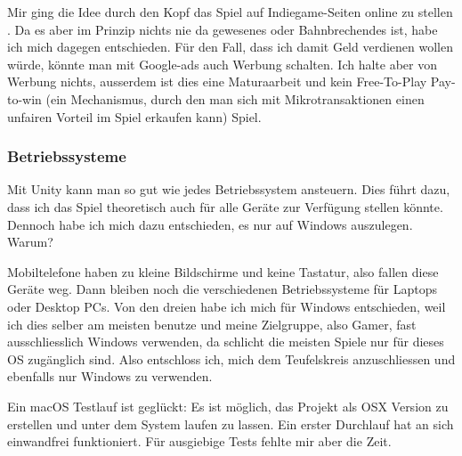 Mir ging die Idee durch den Kopf das Spiel auf Indiegame-Seiten online zu stellen .
Da es aber im Prinzip nichts nie da gewesenes oder Bahnbrechendes ist, habe ich mich dagegen entschieden.
Für den Fall, dass ich damit Geld verdienen wollen würde, könnte man mit Google-ads auch Werbung schalten.
Ich halte aber von Werbung nichts, ausserdem ist dies eine Maturaarbeit und kein Free-To-Play Pay-to-win 
(ein Mechanismus, durch den man sich mit Mikrotransaktionen einen unfairen Vorteil im Spiel erkaufen kann) 
Spiel.

\subsubsection{Betriebssysteme}
Mit Unity kann man so gut wie jedes Betriebssystem ansteuern.
Dies führt dazu, dass ich das Spiel theoretisch auch für alle Geräte zur Verfügung stellen könnte. 
Dennoch habe ich mich dazu entschieden, es nur auf Windows auszulegen.
Warum?

Mobiltelefone haben zu kleine Bildschirme und keine Tastatur, also fallen diese Geräte weg. Dann bleiben noch die verschiedenen Betriebssysteme für Laptops oder Desktop PCs.
Von den dreien habe ich mich für Windows entschieden, weil ich dies selber am meisten benutze und meine \glqq Zielgruppe\grqq, also Gamer, fast ausschliesslich Windows verwenden, da schlicht die meisten Spiele nur für dieses OS zugänglich sind. Also entschloss ich, mich dem Teufelskreis anzuschliessen und ebenfalls nur Windows zu verwenden.

Ein macOS Testlauf ist geglückt: Es ist möglich, das Projekt als OSX Version zu erstellen und unter dem System laufen zu lassen. Ein erster Durchlauf hat an sich einwandfrei funktioniert. Für ausgiebige Tests fehlte mir aber die Zeit.
